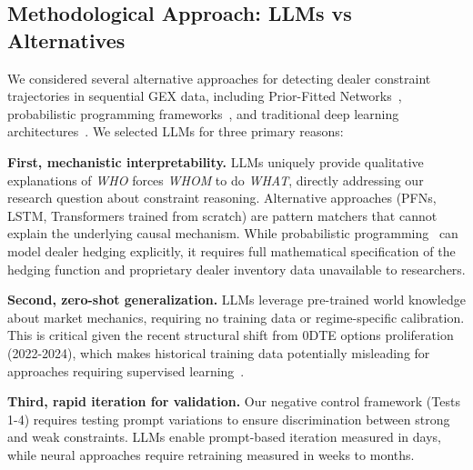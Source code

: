
\subsection{Methodological Approach: LLMs vs Alternatives}

We considered several alternative approaches for detecting dealer constraint trajectories in sequential GEX data, including Prior-Fitted Networks~\cite{muller2021pfn}, probabilistic programming frameworks~\cite{salvatier2016pymc3,bingham2019pyro}, and traditional deep learning architectures~\cite{hochreiter1997lstm,vaswani2017attention}. We selected LLMs for three primary reasons:

\textbf{First, mechanistic interpretability.} LLMs uniquely provide qualitative explanations of \textit{WHO} forces \textit{WHOM} to do \textit{WHAT}, directly addressing our research question about constraint reasoning. Alternative approaches (PFNs, LSTM, Transformers trained from scratch) are pattern matchers that cannot explain the underlying causal mechanism. While probabilistic programming~\cite{salvatier2016pymc3,bingham2019pyro} can model dealer hedging explicitly, it requires full mathematical specification of the hedging function and proprietary dealer inventory data unavailable to researchers.

\textbf{Second, zero-shot generalization.} LLMs leverage pre-trained world knowledge about market mechanics, requiring no training data or regime-specific calibration. This is critical given the recent structural shift from 0DTE options proliferation (2022-2024), which makes historical training data potentially misleading for approaches requiring supervised learning~\cite{muller2021pfn,hochreiter1997lstm}.

\textbf{Third, rapid iteration for validation.} Our negative control framework (Tests 1-4) requires testing prompt variations to ensure discrimination between strong and weak constraints. LLMs enable prompt-based iteration measured in days, while neural approaches require retraining measured in weeks to months.

